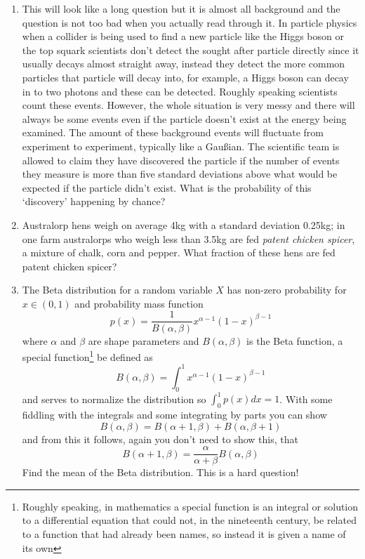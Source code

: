 \documentclass[11pt,a4paper]{scrartcl}
\begin{document}
\begin{enumerate}

  
\item This will look like a long question but it is almost all
  background and the question is not too bad when you actually read
  through it. In particle physics when a collider is being used to
  find a new particle like the Higgs boson or the top squark
  scientists don't detect the sought after particle directly since it
  usually decays almost straight away, instead they detect the more
  common particles that particle will decay into, for example, a Higgs
  boson can decay in to two photons and these can be detected. Roughly
  speaking scientists count these events. However, the whole situation
  is very messy and there will always be some events even if the
  particle doesn't exist at the energy being examined. The amount of
  these background events will fluctuate from experiment to
  experiment, typically like a Gau\ss{}ian. The scientific team is
  allowed to claim they have discovered the particle if the number of
  events they measure is more than five standard deviations above
  what would be expected if the particle didn't exist. What is the
  probability of this \lq{}discovery\rq{} happening by chance?

  
\item Australorp hens weigh on average 4kg with a standard deviation
  0.25kg; in one farm australorps who weigh less than 3.5kg are fed
  \textsl{patent chicken spicer}, a mixture of chalk, corn and
  pepper. What fraction of these hens are fed patent chicken spicer?

\item The Beta distribution for a random variable $X$ has non-zero probability for $x\in(0,1)$ and probability mass function
  \begin{equation}
    p(x)=\frac{1}{B(\alpha,\beta)}x^{\alpha-1}(1-x)^{\beta-1}
  \end{equation}
  where $\alpha$ and $\beta$ are shape parameters and $B(\alpha,\beta)$ is the Beta function, a special function\footnote{Roughly speaking, in mathematics a special function is an integral or solution to a differential equation that could not, in the nineteenth century, be related to a function that had already been names, so instead it is given a name of its own} be defined as
  \begin{equation}
    B(\alpha,\beta)=\int_0^1 x^{\alpha-1}(1-x)^{\beta-1}
  \end{equation}
  and serves to normalize the distribution so $\int_0^1{p(x)dx} =1$. With some fiddling with the integrals and some integrating by parts you can show
  \begin{equation}
    B(\alpha,\beta)=B(\alpha+1,\beta)+B(\alpha,\beta+1)
  \end{equation}
  and from this it follows, again you don't need to show this, that
  \begin{equation}
    B(\alpha+1,\beta)=\frac{\alpha}{\alpha+\beta}B(\alpha,\beta)
  \end{equation}
  Find the mean of the Beta distribution. This is a hard question!


\end{enumerate}
\end{document}

